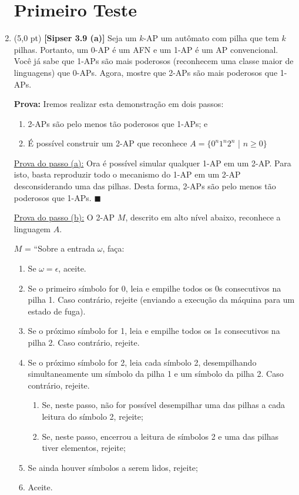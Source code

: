 \documentclass[12pt,a4paper,oneside]{article}
\begin{document}
\begin{enumerate}
	
	\section*{Primeiro Teste}
	
	\item (5,0 pt) {\bf [Sipser 3.9 (a)]} Seja um $k$-AP um autômato com pilha que tem $k$ pilhas. Portanto, um 0-AP é um AFN e um 1-AP é um AP convencional. Você já sabe que 1-APs são mais poderosos (reconhecem uma classe maior de linguagens) que 0-APs. Agora, mostre que 2-APs são mais poderosos que 1-APs.	
	
	\vspace{0.3cm}
	
	{\color{blue}	
		
		{\bf Prova:} Iremos realizar esta demonstração em dois passos:
		\begin{enumerate}
			\item 2-APs são pelo menos tão poderosos que 1-APs; e
			\item É possível construir um 2-AP que reconhece $A = \{0^n1^n2^n$ | $n \geq 0\}$
		\end{enumerate} 
	
		\underline{Prova do passo (a):}  Ora é possível simular qualquer 1-AP em um 2-AP. Para isto, basta reproduzir todo o mecanismo do 1-AP em um 2-AP desconsiderando uma das pilhas. Desta forma, 2-APs são pelo menos tão poderosos que 1-APs. $\blacksquare$
		
		\underline{Prova do passo (b):} O 2-AP $M$, descrito em alto nível abaixo, reconhece a linguagem $A$.
		
		$M$ = ``Sobre a entrada $\omega$, faça:
		\begin{enumerate}
			\item Se $\omega = \epsilon$, aceite.
			\item Se o primeiro símbolo for 0, leia e empilhe todos os 0s consecutivos na pilha 1. Caso contrário, rejeite (enviando a execução da máquina para um estado de fuga).
			\item Se o próximo símbolo for 1, leia e empilhe todos os 1s consecutivos na pilha 2. Caso contrário, rejeite.
			\item Se o próximo símbolo for 2, leia cada símbolo 2, desempilhando simultaneamente um símbolo da pilha 1 e um símbolo da pilha 2. Caso contrário, rejeite.
			\begin{enumerate}
				\item Se, neste passo, não for possível desempilhar uma das pilhas a cada leitura do símbolo 2, rejeite;
				\item Se, neste passo, encerrou a leitura de símbolos 2 e uma das pilhas tiver elementos, rejeite;
			\end{enumerate}
			\item Se ainda houver símbolos a serem lidos, rejeite;
			\item Aceite.		
		\end{enumerate} 
	
}
\end{enumerate}
\end{document}
